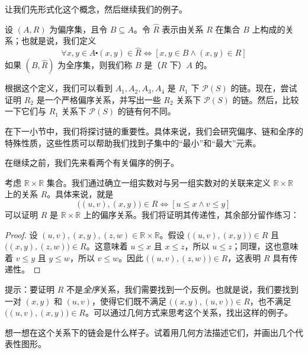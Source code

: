 让我们先形式化这个概念，然后继续我们的例子。

\begin{definition}
    设 $(A, R)$ 为偏序集，且令 $B \subseteq A$。令 $\hat{R}$ 表示由关系 $R$ 在集合 $B$ 上构成的关系；也就是说，我们定义
    \[\forall x, y \in A \centerdot (x, y) \in \hat{R} \iff [x, y \in B \land (x, y) \in R]\]
    如果 $(B, \hat{R})$ 为全序集，则我们称 $B$ 是（$R$ 下）$A$ 的。
\end{definition}

根据这个定义，我们可以看到 $A_1, A_2, A_3, A_4$ 是 $R_1$ 下 $\mathcal{P}(S)$ 的链。现在，尝试证明 $R_2$ 是一个严格偏序关系，并写出一些 $R_2$ 关系下 $\mathcal{P}(S)$ 的链。然后，比较一下它们与 $R_1$ 关系下 $\mathcal{P}(S)$ 的链有何不同。

在下一小节中，我们将探讨链的重要性。具体来说，我们会研究偏序、链和全序的特殊性质，这些性质可以帮助我们找到子集中的``最小''和``最大''元素。

在继续之前，我们先来看两个有关偏序的例子。\\

\begin{example}
    考虑 $\mathbb{R} \times \mathbb{R}$ 集合。我们通过确立一组实数对与另一组实数对的关联来定义 $\mathbb{R} \times \mathbb{R}$ 上的关系 $R$。具体来说，就是
    \[\big((u, v),(x, y)\big) \in R \iff [u \le x \land v \le y]\]
    可以证明 $R$ 是 $\mathbb{R} \times \mathbb{R}$ 上的偏序关系。我们将证明其传递性，其余部分留作练习：
\end{example}

\begin{proof}
    设 $(u, v),(x, y),(z, w) \in \mathbb{R} \times \mathbb{R}$。假设 $\big((u, v),(x, y)\big) \in R$ 且 $\big((x, y),(z, w)\big) \in R$。这意味着 $u \le x$ 且 $x \le z$，所以 $u \le z$；同理，这也意味着 $v \le y$ 且 $y \le w$，所以 $v \le w$。因此 $\big((u, v),(z, w)\big) \in R$，这表明 $R$ 具有传递性。
\end{proof}

提示：要证明 $R$ 不是\emph{全序}关系，我们需要找到一个反例。也就是说，我们要找到一对 $(x, y)$ 和 $(u, v)$，使得它们既不满足 $\big((x, y),(u, v)\big) \in R$，也不满足 $\big((u, v),(x, y)\big) \in R$。可以通过几何方式来思考这个关系，找出这样的例子。

想一想在这个关系下的链会是什么样子。试着用几何方法描述它们，并画出几个代表性图形。\\

